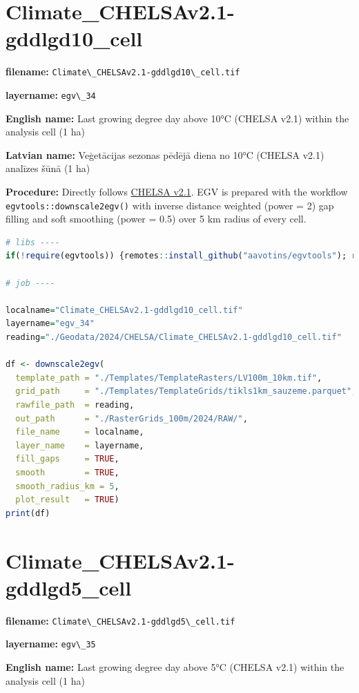 \documentclass[
]{book}
\newcommand{\passthrough}[1]{#1}
\begin{document}
\section{Climate\_CHELSAv2.1-gddlgd10\_cell}\label{ch06.034}

\textbf{filename:} \passthrough{\lstinline!Climate\_CHELSAv2.1-gddlgd10\_cell.tif!}

\textbf{layername:} \passthrough{\lstinline!egv\_34!}

\textbf{English name:} Last growing degree day above 10°C (CHELSA v2.1) within the analysis cell (1 ha)

\textbf{Latvian name:} Veģetācijas sezonas pēdējā diena no 10°C (CHELSA v2.1) analīzes šūnā (1 ha)

\textbf{Procedure:} Directly follows \hyperref[Ch04.11]{CHELSA v2.1}. EGV is prepared with the
workflow \passthrough{\lstinline!egvtools::downscale2egv()!} with inverse distance weighted (power = 2)
gap filling and soft smoothing (power = 0.5) over 5 km radius of every cell.

\begin{lstlisting}[language=R]
# libs ----
if(!require(egvtools)) {remotes::install_github("aavotins/egvtools"); require(egvtools)}

# job ----

localname="Climate_CHELSAv2.1-gddlgd10_cell.tif"
layername="egv_34"
reading="./Geodata/2024/CHELSA/Climate_CHELSAv2.1-gddlgd10_cell.tif"

df <- downscale2egv(
  template_path = "./Templates/TemplateRasters/LV100m_10km.tif",
  grid_path     = "./Templates/TemplateGrids/tikls1km_sauzeme.parquet",
  rawfile_path  = reading,
  out_path      = "./RasterGrids_100m/2024/RAW/",
  file_name     = localname,
  layer_name    = layername,
  fill_gaps     = TRUE,
  smooth        = TRUE,
  smooth_radius_km = 5,
  plot_result   = TRUE)
print(df)
\end{lstlisting}

\section{Climate\_CHELSAv2.1-gddlgd5\_cell}\label{ch06.035}

\textbf{filename:} \passthrough{\lstinline!Climate\_CHELSAv2.1-gddlgd5\_cell.tif!}

\textbf{layername:} \passthrough{\lstinline!egv\_35!}

\textbf{English name:} Last growing degree day above 5°C (CHELSA v2.1) within the analysis cell (1 ha)
\end{document}
